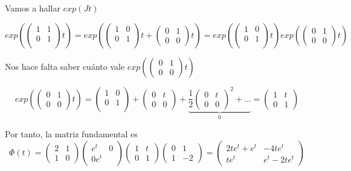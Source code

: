 \begin{example}
Vamos a hallar $exp(Jt)$
\begin{center}
$exp(\begin{pmatrix}
1 & 1\\0 & 1\\
\end{pmatrix}t) = exp(\begin{pmatrix}
1 & 0\\ 0 & 1\\
\end{pmatrix}t+\begin{pmatrix}
0 & 1\\ 0 & 0
\end{pmatrix}t) = exp(\begin{pmatrix}
1 & 0\\ 0 & 1\\
\end{pmatrix}t)exp(\begin{pmatrix}
0 & 1\\ 0 & 0
\end{pmatrix}t)$
\end{center}

Nos hace falta saber cuánto vale $exp(\begin{pmatrix}
0 & 1\\ 0 & 0
\end{pmatrix}t)$

$$exp(\begin{pmatrix}
0 & 1\\ 0 & 0
\end{pmatrix}t) = \begin{pmatrix}
1 & 0 \\ 0 & 1\\
\end{pmatrix} + \begin{pmatrix}
0 & t \\ 0 & 0 
\end{pmatrix} + \underbrace{\frac{1}{2}\begin{pmatrix}
0 & t \\ 0 & 0
\end{pmatrix}^2 + \hdots}_0 = \begin{pmatrix}
1 & t\\ 0 & 1
\end{pmatrix}$$

Por tanto, la matriz fundamental es
$$\Phi(t) = \begin{pmatrix}
2 & 1\\1  & 0
\end{pmatrix}\begin{pmatrix}
e^t & 0\\ 0 e^t
\end{pmatrix}\begin{pmatrix}
1 & t\\ 0 & 1
\end{pmatrix}\begin{pmatrix}
0 & 1\\1 & -2
\end{pmatrix} = \begin{pmatrix}
2te^t+e^t & -4te^t\\te^t& e^t-2te^t
\end{pmatrix}$$
\end{example}

